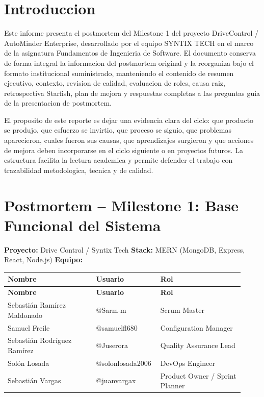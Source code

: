 \documentclass[11pt,a4paper]{article}
\begin{document}
\clearpage
{}
\tableofcontents
\clearpage

\clearpage
\section{Introduccion}

Este informe presenta el postmortem del Milestone 1 del proyecto DriveControl / AutoMinder Enterprise, desarrollado por el equipo SYNTIX TECH en el marco de la asignatura Fundamentos de Ingenieria de Software. El documento conserva de forma integral la informacion del postmortem original y la reorganiza bajo el formato institucional suministrado, manteniendo el contenido de resumen ejecutivo, contexto, revision de calidad, evaluacion de roles, causa raiz, retrospectiva Starfish, plan de mejora y respuestas completas a las preguntas guia de la presentacion de postmortem.

El proposito de este reporte es dejar una evidencia clara del ciclo: que producto se produjo, que esfuerzo se invirtio, que proceso se siguio, que problemas aparecieron, cuales fueron sus causas, que aprendizajes surgieron y que acciones de mejora deben incorporarse en el ciclo siguiente o en proyectos futuros. La estructura facilita la lectura academica y permite defender el trabajo con trazabilidad metodologica, tecnica y de calidad.

\clearpage
\section{Postmortem -- Milestone 1: Base Funcional del Sistema}
\textbf{Proyecto:} Drive Control / Syntix Tech
\textbf{Stack:} MERN (MongoDB, Express, React, Node.js)
\textbf{Equipo:}

\begingroup
\scriptsize
\setlength{\tabcolsep}{3pt}
\begin{longtable}{P{0.36\linewidth}P{0.22\linewidth}P{0.34\linewidth}}
\toprule
\textbf{Nombre} & \textbf{Usuario} & \textbf{Rol} \\
\midrule
\endfirsthead
\toprule
\textbf{Nombre} & \textbf{Usuario} & \textbf{Rol} \\
\midrule
\endhead
\bottomrule
\endlastfoot
Sebastián Ramírez Maldonado & @Sarm-m & Scrum Master \\
Samuel Freile & @samuelfl680 & Configuration Manager \\
Sebastián Rodríguez Ramírez & @Juserora & Quality Assurance Lead \\
Solón Losada & @solonlosada2006 & DevOps Engineer \\
Sebastián Vargas & @juanvargax & Product Owner / Sprint Planner \\
\end{longtable}
\endgroup
\end{document}
